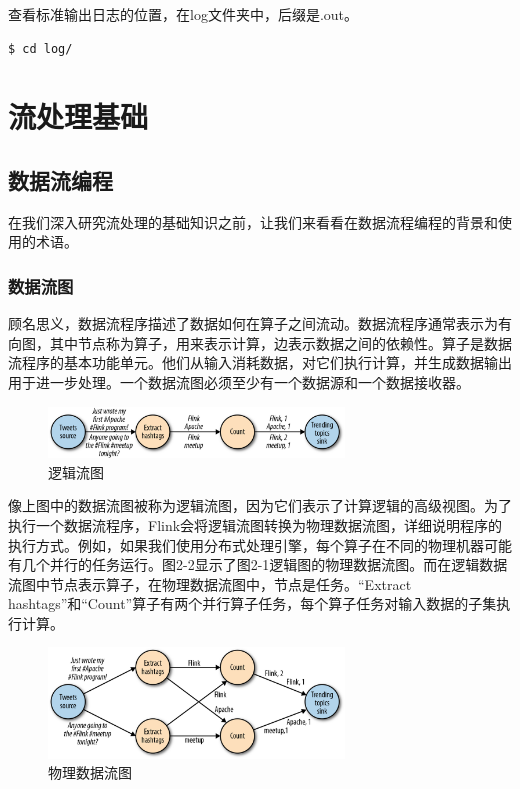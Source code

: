 \documentclass[cn,11pt,chinese]{elegantbook}
\begin{document}
查看标准输出日志的位置，在log文件夹中，后缀是.out。

\begin{verbatim}
$ cd log/
\end{verbatim}

\chapter{流处理基础}

\section{数据流编程}

在我们深入研究流处理的基础知识之前，让我们来看看在数据流程编程的背景和使用的术语。

\subsection{数据流图}

顾名思义，数据流程序描述了数据如何在算子之间流动。数据流程序通常表示为有向图，其中节点称为算子，用来表示计算，边表示数据之间的依赖性。算子是数据流程序的基本功能单元。他们从输入消耗数据，对它们执行计算，并生成数据输出用于进一步处理。一个数据流图必须至少有一个数据源和一个数据接收器。

\begin{figure}[htbp]
  \centering
  \includegraphics[width=0.7\textwidth]{images/spaf_0201.png}
  \caption{逻辑流图}
\end{figure}

像上图中的数据流图被称为逻辑流图，因为它们表示了计算逻辑的高级视图。为了执行一个数据流程序，Flink会将逻辑流图转换为物理数据流图，详细说明程序的执行方式。例如，如果我们使用分布式处理引擎，每个算子在不同的物理机器可能有几个并行的任务运行。图2-2显示了图2-1逻辑图的物理数据流图。而在逻辑数据流图中节点表示算子，在物理数据流图中，节点是任务。“Extract hashtags”和“Count”算子有两个并行算子任务，每个算子任务对输入数据的子集执行计算。

\begin{figure}[htbp]
  \centering
  \includegraphics[width=0.7\textwidth]{images/spaf_0202.png}
  \caption{物理数据流图}
\end{figure}
\end{document}
